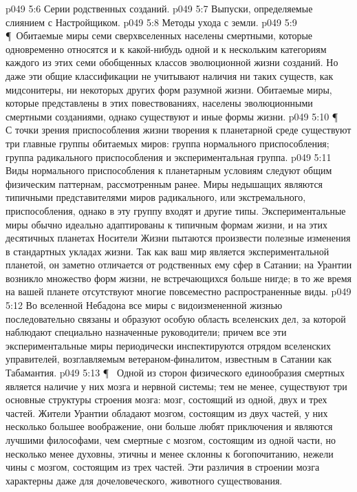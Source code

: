 \vs p049 5:6 \bibnobreakspace Серии родственных созданий.
\vs p049 5:7 \bibnobreakspace Выпуски, определяемые слиянием с Настройщиком.
\vs p049 5:8 \bibnobreakspace Методы ухода с земли.
\vs p049 5:9 \P\ Обитаемые миры семи сверхвселенных населены смертными, которые одновременно относятся и к какой\hyp{}нибудь одной и к нескольким категориям каждого из этих семи обобщенных классов эволюционной жизни созданий. Но даже эти общие классификации не учитывают наличия ни таких существ, как мидсонитеры, ни некоторых других форм разумной жизни. Обитаемые миры, которые представлены в этих повествованиях, населены эволюционными смертными созданиями, однако существуют и иные формы жизни.
\vs p049 5:10 \P\ \bibnobreakspace {} С точки зрения приспособления жизни творения к планетарной среде существуют три главные группы обитаемых миров: группа нормального приспособления; группа радикального приспособления и экспериментальная группа.
\vs p049 5:11 Виды нормального приспособления к планетарным условиям следуют общим физическим паттернам, рассмотренным ранее. Миры недышащих являются типичными представителями миров радикального, или экстремального, приспособления, однако в эту группу входят и другие типы. Экспериментальные миры обычно идеально адаптированы к типичным формам жизни, и на этих десятичных планетах Носители Жизни пытаются произвести полезные изменения в стандартных укладах жизни. Так как ваш мир является экспериментальной планетой, он заметно отличается от родственных ему сфер в Сатании; на Урантии возникло множество форм жизни, не встречающихся больше нигде; в то же время на вашей планете отсутствуют многие повсеместно распространенные виды.
\vs p049 5:12 Во вселенной Небадона все миры с видоизмененной жизнью последовательно связаны и образуют особую область вселенских дел, за которой наблюдают специально назначенные руководители; причем все эти экспериментальные миры периодически инспектируются отрядом вселенских управителей, возглавляемым ветераном\hyp{}финалитом, известным в Сатании как Табамантия.
\vs p049 5:13 \P\ \bibnobreakspace {} Одной из сторон физического единообразия смертных является наличие у них мозга и нервной системы; тем не менее, существуют три основные структуры строения мозга: мозг, состоящий из одной, двух и трех частей. Жители Урантии обладают мозгом, состоящим из двух частей, у них несколько большее воображение, они больше любят приключения и являются лучшими философами, чем смертные с мозгом, состоящим из одной части, но несколько менее духовны, этичны и менее склонны к богопочитанию, нежели чины с мозгом, состоящим из трех частей. Эти различия в строении мозга характерны даже для дочеловеческого, животного существования.
